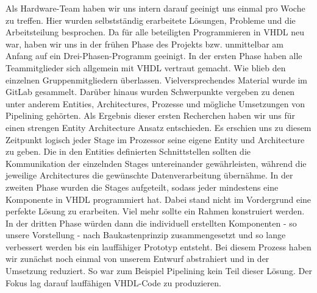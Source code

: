 \documentclass[paper=a4,fontsize=12pt,twocolumn]{scrreprt}
\begin{document}
Als Hardware-Team haben wir uns intern darauf geeinigt uns einmal pro Woche zu treffen.
Hier wurden selbstständig erarbeitete Lösungen, Probleme und die Arbeitsteilung besprochen.
Da für alle beteiligten Programmieren in VHDL neu war, haben wir uns in der frühen Phase des Projekts bzw. unmittelbar am Anfang auf ein Drei-Phasen-Programm geeinigt.
In der ersten Phase haben alle Teammitglieder sich allgemein mit VHDL vertraut gemacht.
Wie blieb den einzelnen Gruppenmitgliedern überlassen.
Vielversprechendes Material wurde im GitLab gesammelt.
Darüber hinaus wurden Schwerpunkte vergeben zu denen unter anderem Entities, Architectures, Prozesse und mögliche Umsetzungen von Pipelining gehörten.
Als Ergebnis dieser ersten Recherchen haben wir uns für einen strengen Entity Architecture Ansatz entschieden.
Es erschien uns zu diesem Zeitpunkt logisch jeder Stage im Prozessor seine eigene Entity und Architecture zu geben.
Die in den Entities definierten Schnittstellen sollten die Kommunikation der einzelnden Stages untereinander gewährleisten, während die jeweilige Architectures die gewünschte Datenverarbeitung übernähme.
In der zweiten Phase wurden die Stages aufgeteilt, sodass jeder mindestens eine Komponente in VHDL programmiert hat.
Dabei stand nicht im Vordergrund eine perfekte Lösung zu erarbeiten.
Viel mehr sollte ein Rahmen konstruiert werden.
In der dritten Phase würden dann die individuell erstellten Komponenten - so unsere Vorstellung - nach Baukastenprinzip zusammengesetzt und so lange verbessert werden bis ein lauffähiger Prototyp entsteht. %
Bei diesem Prozess haben wir zunächst noch einmal von unserem Entwurf abstrahiert und in der Umsetzung reduziert.
So war zum Beispiel Pipelining kein Teil dieser Lösung. %
Der Fokus lag darauf lauffähigen VHDL-Code zu produzieren.
\end{document}
